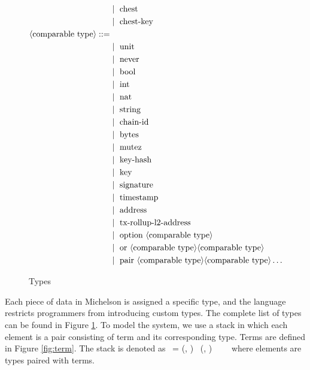 \documentclass[a4paper,UKenglish,cleveref, autoref, thm-restate]{lipics-v2021}
\begin{document}
\begin{figure} []
\begin{align*}
   &\mid\ \text{chest} \\
   &\mid\ \text{chest-key} \\
\langle\text{comparable type}\rangle ::= \\
   &\mid\ \text{unit} \\
   &\mid\ \text{never} \\
   &\mid\ \text{bool} \\
   &\mid\ \text{int}\\
   &\mid\ \text{nat}\\
   &\mid\ \text{string}\\
   &\mid\ \text{chain-id}\\
   &\mid\ \text{bytes}\\
   &\mid\ \text{mutez}\\
   &\mid\ \text{key-hash}\\
   &\mid\ \text{key}\\
   &\mid\ \text{signature}\\
   &\mid\ \text{timestamp}\\
   &\mid\ \text{address}\\
   &\mid\ \text{tx-rollup-l2-address}\\
   &\mid\ \text{option}\ \langle\text{comparable type}\rangle\\
   &\mid\ \text{or}\ \langle\text{comparable type}\rangle \langle\text{comparable type}\rangle\\
   &\mid\ \text{pair}\ \langle\text{comparable type}\rangle \langle\text{comparable type}\rangle \dots \\
\end{align*}
\caption{Types}
\label{fig:type}
\end{figure}
Each piece of data in Michelson is assigned a specific type, and the language restricts programmers from introducing custom types. The complete list of types can be found in Figure \ref{fig:type}. To model the system, we use a stack in which each element is a pair consisting of term and its corresponding type. Terms are defined in Figure \ref{fig:term}. The stack is denoted as \STACK\ = (\TermOne, \TYF) \STACKCONCAT\ (\TermTwo, \TYS) \STACKCONCAT\ \DOT\ \STACKCONCAT\ \EMPTYSTACK\ where elements are types paired with terms. 
\end{document}

